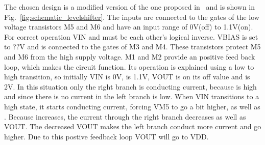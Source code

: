 The chosen design is a modified version of the one proposed in~\cite{powerdac} and is shown in Fig.~\ref{fig:schematic_levelshifter}. The inputs are connected to the gates of the low voltage transistors M5 and M6 and have an input range of 0V(off) to 1.1V(on). For correct operation VIN and  must be each other's logical inverse. VBIAS is set to ??V and is connected to the gates of M3 and M4. These transistors protect M5 and M6 from the high supply voltage. M1 and M2 provide an positive feed back loop, which makes the circuit function. Its operation is explained using a low to high transition, so initially VIN is 0V,  is 1.1V, VOUT is on its off value and  is 2V. In this situation only the right branch is conducting current, because  is high and since there is no current in the left branch  is low. When VIN transitions to a high state, it starts conducting current, forcing VM5 to go a bit higher, as well as . Because  increases, the current through the right branch decreases as well as VOUT. The decreased VOUT makes the left branch conduct more current and  go higher. Due to this postive feedback loop VOUT will go to VDD.